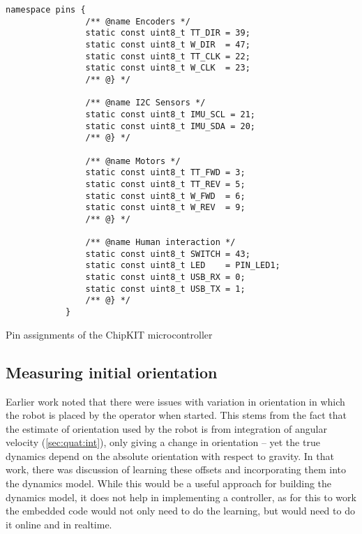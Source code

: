 \documentclass[main.tex]{subfiles}
\begin{document}
	\begin{listingfloat}[!tb]
		\begin{lstlisting}[language={[11]c++},gobble=6,frame=single]
			namespace pins {
				/** @name Encoders */
				static const uint8_t TT_DIR = 39;
				static const uint8_t W_DIR  = 47;
				static const uint8_t TT_CLK = 22;
				static const uint8_t W_CLK  = 23;
				/** @} */

				/** @name I2C Sensors */
				static const uint8_t IMU_SCL = 21;
				static const uint8_t IMU_SDA = 20;
				/** @} */

				/** @name Motors */
				static const uint8_t TT_FWD = 3;
				static const uint8_t TT_REV = 5;
				static const uint8_t W_FWD  = 6;
				static const uint8_t W_REV  = 9;
				/** @} */

				/** @name Human interaction */
				static const uint8_t SWITCH = 43;
				static const uint8_t LED    = PIN_LED1;
				static const uint8_t USB_RX = 0;
				static const uint8_t USB_TX = 1;
				/** @} */
			}
		\end{lstlisting}
		\caption{Pin assignments of the ChipKIT microcontroller}
		\label{lst:pins}
	\end{listingfloat}

\subsection{Measuring initial orientation}
	Earlier work \cite{aleksi} noted that there were issues with variation in orientation in which the robot is placed by the operator when started.
	This stems from the fact that the estimate of orientation used by the robot is from integration of angular velocity (\cref{sec:quat:int}), only giving a change in orientation -- yet the true dynamics depend on the absolute orientation with respect to gravity.
	In that work, there was discussion of learning these offsets and incorporating them into the dynamics model.
	While this would be a useful approach for building the dynamics model, it does not help in implementing a controller, as for this to work the embedded code would not only need to do the learning, but would need to do it online and in realtime.
\end{document}
